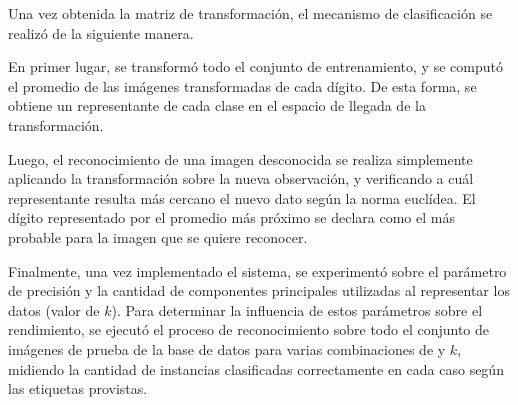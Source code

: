 Una vez obtenida la matriz de transformación, el mecanismo de clasificación se realizó de la siguiente manera.

En primer lugar, se transformó todo el conjunto de entrenamiento, y se computó el promedio de las imágenes transformadas de cada dígito. De esta forma, se obtiene un representante de cada clase en el espacio de llegada de la transformación.

Luego, el reconocimiento de una imagen desconocida se realiza simplemente aplicando la transformación sobre la nueva observación, y verificando a cuál representante resulta más cercano el nuevo dato según la norma euclídea. El dígito representado por el promedio más próximo se declara como el más probable para la imagen que se quiere reconocer.

Finalmente, una vez implementado el sistema, se experimentó sobre el parámetro de precisión \delt y la cantidad de componentes principales utilizadas al representar los datos (valor de $k$). Para determinar la influencia de estos parámetros sobre el rendimiento, se ejecutó el proceso de reconocimiento sobre todo el conjunto de imágenes de prueba de la base de datos para varias combinaciones de \delt y $k$, midiendo la cantidad de instancias clasificadas correctamente en cada caso según las etiquetas provistas.